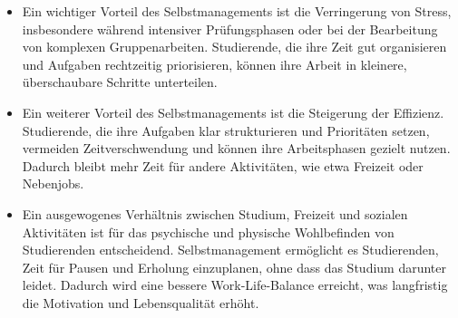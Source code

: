 \documentclass[10pt, oneside]{article}
\begin{document}
\begin{itemize}
    \item Ein wichtiger Vorteil des Selbstmanagements ist die Verringerung von
        Stress, insbesondere während intensiver Prüfungsphasen oder bei der
        Bearbeitung von komplexen Gruppenarbeiten. Studierende, die ihre Zeit
        gut organisieren und Aufgaben rechtzeitig priorisieren, können ihre
        Arbeit in kleinere, überschaubare Schritte unterteilen.
    \item Ein weiterer Vorteil des Selbstmanagements ist die Steigerung der
        Effizienz. Studierende, die ihre Aufgaben klar strukturieren und
        Prioritäten setzen, vermeiden Zeitverschwendung und können ihre
        Arbeitsphasen gezielt nutzen. Dadurch bleibt mehr Zeit für andere
        Aktivitäten, wie etwa Freizeit oder Nebenjobs.
    \item Ein ausgewogenes Verhältnis zwischen Studium, Freizeit und sozialen
        Aktivitäten ist für das psychische und physische Wohlbefinden von
        Studierenden entscheidend. Selbstmanagement ermöglicht es Studierenden,
        Zeit für Pausen und Erholung einzuplanen, ohne dass das Studium
        darunter leidet. Dadurch wird eine bessere Work-Life-Balance erreicht,
        was langfristig die Motivation und Lebensqualität erhöht.
\end{itemize}
\end{document}
